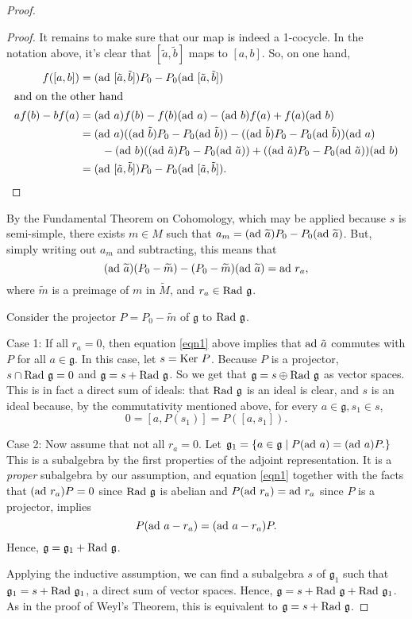 \documentclass{amsart}
\newcommand*{\g}{\mathfrak{g}}
\newcommand*{\rg}{\textnormal{Rad }\g}
\newcommand*{\ad}{\textnormal{ad }}
\begin{document}
\begin{proof}
\begin{proof}
It remains to make sure that our map is indeed a 1-cocycle.  In the
notation above, it's clear that $[\tilde{a},\tilde{b}]$ maps to
$[a,b]$.  So, on one hand,
\begin{align*}
f([a,b]) &= (\ad [\tilde{a}, \tilde{b}])P_{0} - P_{0}(\ad
[\tilde{a},
\tilde{b}]) \\
\intertext{and on the other hand} a f(b) - b f(a) &= (\ad a)f(b)
-f(b)(\ad a) - (\ad b)f(a) + f(a)(\ad b)\\
&= (\ad a)((\ad \tilde{b})P_{0} - P_{0} (\ad \tilde{b})) - ((\ad
\tilde{b})P_{0} -P_{0}(\ad \tilde{b}))(\ad a)\\
& \hspace{2 em} - (\ad b)((\ad \tilde{a})P_{0} - P_{0}(\ad
\tilde{a})) + ((\ad \tilde{a})P_{0} - P_{0}(\ad \tilde{a}))(\ad b)\\
&= (\ad [\tilde{a}, \tilde{b}])P_{0} - P_{0}(\ad [\tilde{a},
\tilde{b}]).
\end{align*}
\end{proof}

By the Fundamental Theorem on Cohomology, which may be applied
because $s$ is semi-simple, there exists $m \in M$ such that $a_{m}
= (\ad \widetilde{a})P_{0} - P_{0}(\ad \widetilde{a})$.  But, simply
writing out $a_{m}$ and subtracting, this means that
\begin{equation}
(\ad \widetilde{a})(P_{0} - \widetilde{m}) -(P_{0} -
\widetilde{m})(\ad \widetilde{a}) = \ad r_{a}, \label{eqn1}
\end{equation}
 where $\widetilde{m}$
is a preimage of $m$ in $\widetilde{M}$, and $r_{a} \in \rg$.

Consider the projector $P = P_{0} - \widetilde{m}$ of $\g$ to $\rg$.

\vspace{1 em} \noindent Case 1:  If all $r_{a} = 0$, then equation
\ref{eqn1} above implies that $\ad \tilde{a}$ commutes with $P$ for
all $a \in \g$.  In this case, let $s = \textnormal{Ker } P$.
Because $P$ is a projector, $s \cap \rg = 0$ and $\g = s + \rg$. So
we get that $\g = s \oplus \rg$ as vector spaces.  This is in fact a
direct sum of ideals:  that $\rg$ is an ideal is clear, and $s$ is
an ideal because, by the commutativity mentioned above, for every $a
\in \g, s_{1} \in s$,
$$0 = [a,P(s_{1})] = P([a,s_{1}]).$$

\vspace{1 em} \noindent Case 2: Now assume that not all $r_{a} = 0$.
Let $\g_{1} = \{a\in \g \mid P(\ad a) = (\ad a)P.\}$  This is a
subalgebra by the first properties of the adjoint representation. It
is a \textit{proper} subalgebra by our assumption, and equation
\ref{eqn1} together with the facts that $(\ad r_{a})P = 0$ since
$\rg$ is abelian and $P(\ad r_{a}) = \ad r_{a}$ since $P$ is a
projector, implies $$P(\ad a - r_{a}) = (\ad a - r_{a})P.$$  Hence,
$\g = \g_{1} + \rg$.

Applying the inductive assumption, we can find a subalgebra $s$ of
$\g_{1}$ such that $\g_{1} = s + \textnormal{Rad } \g_{1}$, a direct
sum of vector spaces.  Hence, $\g = s + \rg + \textnormal{Rad }
\g_{1}$.  As in the proof of Weyl's Theorem, this is equivalent to
$\g = s + \rg$.

\end{proof}
\end{document}
